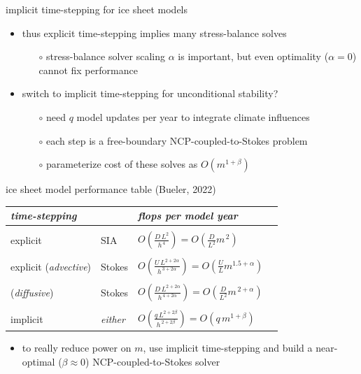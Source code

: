 \documentclass[svgnames,
               hyperref={colorlinks,citecolor=DeepPink4,linkcolor=FireBrick,urlcolor=Maroon},
               usepdftitle=false]  %
               {beamer}
\newcommand{\oo}[1]{\displaystyle O\left(#1\right)}
\begin{document}
\begin{frame}{implicit time-stepping for ice sheet models}

\begin{itemize}
\item thus \alert{explicit} time-stepping \alert{implies many stress-balance solves}
    \begin{itemize}
    \item[$\circ$] stress-balance solver scaling $\alpha$ is important, but even optimality ($\alpha=0$) cannot fix performance
    \end{itemize}
\item switch to \alert{implicit time-stepping} for unconditional stability?
    \begin{itemize}
    \item[$\circ$] need $q$ model updates per year to integrate climate influences
    \item[$\circ$] each step is a \alert{free-boundary} NCP-coupled-to-Stokes problem
    \item[$\circ$] parameterize cost of these solves as $O(m^{1+\beta})$
    \end{itemize}
\end{itemize}
\end{frame}


\begin{frame}{ice sheet model performance table (Bueler, 2022)}

\begin{tabular}{llll}
\emph{time-stepping} &  & \emph{flops per model year} \\ \hline
\\
explicit & SIA    & $\oo{\frac{D\, L^2}{h^{\,4}}} = \oo{\frac{D}{L^2} m^{\,2}}$ \\
\\
explicit ({\footnotesize \emph{advective}}) & Stokes & $\oo{\frac{U \,L^{2+2\alpha}}{h^{\,3+2\alpha}}} = \oo{\frac{U}{L} m^{1.5+\alpha}}$ \\
\\
\phantom{explicit} ({\footnotesize \emph{diffusive}})  & Stokes & $\oo{\frac{D\, L^{2+2\alpha}}{h^{\,4+2\alpha}}} = \oo{\frac{D}{L^2} m^{\,2+\alpha}}$ \\
\\
implicit & \emph{either} & $\oo{\frac{q\, L^{2+2\beta}}{h^{\,2+2\beta}}} = \oo{q\, m^{1+\beta}}$
\end{tabular}

\bigskip
\begin{itemize}
\item to really reduce power on $m$, use \alert{implicit} time-stepping and build a \alert{near-optimal ($\beta \approx 0$) NCP-coupled-to-Stokes solver}
\end{itemize}
\end{frame}
\end{document}
